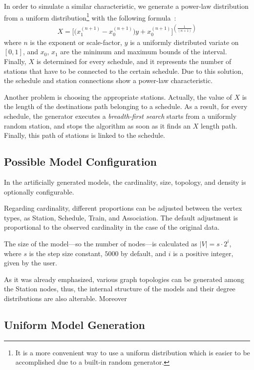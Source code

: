 In order to simulate a similar characteristic, we generate a power-law distribution from a uniform distribution\footnote{It is a more convenient way to use a uniform distribution which is easier to be accomplished due to a built-in random generator.} with the following formula~\cite{power_law_from_uniform}:
\begin{align}
	X = \Big[\big(x_1^{(n+1)} - x_0^{(n+1)}\big)y + x_0^{(n+1)}\Big]^{(\frac{1}{(n+1)})}
\end{align} 
where $n$ is the exponent or scale-factor, $y$ is a uniformly distributed variate on $[0,1]$, and $x_0$, $x_1$ are the minimum and maximum bounds of the interval. Finally, $X$ is determined for every schedule, and it represents the number of stations that have to be connected to the certain schedule. Due to this solution, the schedule and station connections show a power-law characteristic.

Another problem is choosing the appropriate stations. Actually, the value of $X$ is the length of the destinations path belonging to a schedule. As a result, for every schedule, the generator executes a \textit{breadth-first search} starts from a uniformly random station, and stops the algorithm as soon as it finds an $X$ length path. Finally, this path of stations is linked to the schedule.


\subsection{Possible Model Configuration}

In the artificially generated models, the cardinality, size, topology, and density is optionally configurable. 

Regarding cardinality, different proportions can be adjusted between the vertex types, as \textsf{Station}, \textsf{Schedule}, \textsf{Train}, and \textsf{Association}. The default adjustment is proportional to the observed cardinality in the case of the original data.

The size of the model---so the number of nodes---is calculated as $|V| = s \cdot 2^i$, where $s$ is the step size constant, $5000$ by default, and $i$ is a positive integer, given by the user.

As it was already emphasized, various graph topologies can be generated among the \textsf{Station} nodes, thus, the internal structure of the models and their degree distributions are also alterable. Moreover %

\subsection{Uniform Model Generation}

